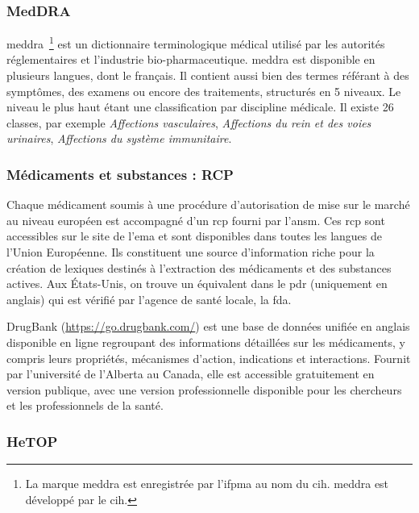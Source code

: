 \subsubsection{MedDRA}

\gls{meddra}~\footnote{La marque \gls{meddra} est enregistrée par l'\acs{ifpma} au nom du \acs{cih}. \gls{meddra} est développé par le \gls{cih}.} \cite{brownMedicalDictionaryRegulatory1999} est un dictionnaire terminologique médical utilisé par les autorités réglementaires et l'industrie bio-pharmaceutique.
\gls{meddra} est disponible en plusieurs langues, dont le français.
Il contient aussi bien des termes référant à des symptômes, des examens ou encore des traitements, structurés en 5 niveaux.
Le niveau le plus haut étant une classification par discipline médicale.
Il existe 26 classes, par exemple \textit{Affections vasculaires}, \textit{Affections du rein et des voies urinaires}, \textit{Affections du système immunitaire}.

\subsubsection{Médicaments et substances : RCP}

Chaque médicament soumis à une procédure d'autorisation de mise sur le marché au niveau européen est accompagné d'un \gls{rcp} fourni par l'\gls{ansm}.
Ces \gls{rcp} sont accessibles sur le site de l'\gls{ema} et sont disponibles dans toutes les langues de l'Union Européenne.
Ils constituent une source d'information riche pour la création de lexiques destinés à l'extraction des médicaments et des substances actives.
Aux États-Unis, on trouve un équivalent dans le \gls{pdr} (uniquement en anglais) qui est vérifié par l'agence de santé locale, la \gls{fda}.

DrugBank \cite{wishartDrugBankKnowledgebaseDrugs2008,wishartDrugBankMajorUpdate2018} (\url{https://go.drugbank.com/}) est une base de données unifiée en anglais disponible en ligne regroupant des informations détaillées sur les médicaments, y compris leurs propriétés, mécanismes d'action, indications et interactions.
Fournit par l'université de l'Alberta au Canada, elle est accessible gratuitement en version publique, avec une version professionnelle disponible pour les chercheurs et les professionnels de la santé.

\subsubsection{HeTOP}

